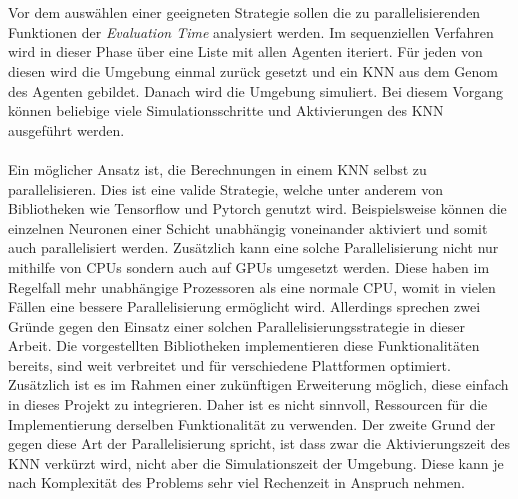 \\\\
Vor dem auswählen einer geeigneten Strategie sollen die zu parallelisierenden Funktionen der \emph{Evaluation Time} analysiert werden. Im sequenziellen Verfahren wird in dieser Phase über eine Liste mit allen Agenten iteriert. Für jeden von diesen wird die Umgebung einmal zurück gesetzt und ein \ac{KNN} aus dem Genom des Agenten gebildet. Danach wird die Umgebung simuliert. Bei diesem Vorgang können beliebige viele Simulationsschritte und Aktivierungen des \ac{KNN} ausgeführt werden. 
\\\\
Ein möglicher Ansatz ist, die Berechnungen in einem \ac{KNN} selbst zu parallelisieren. Dies ist eine valide Strategie, welche unter anderem von Bibliotheken wie Tensorflow und Pytorch genutzt wird. Beispielsweise können die einzelnen Neuronen einer Schicht unabhängig voneinander aktiviert und somit auch parallelisiert werden. Zusätzlich kann eine solche Parallelisierung nicht nur mithilfe von \acp{CPU} sondern auch auf \acp{GPU} umgesetzt werden. Diese haben im Regelfall mehr unabhängige Prozessoren als eine normale \ac{CPU}, womit in vielen Fällen eine bessere Parallelisierung ermöglicht wird. Allerdings sprechen zwei Gründe gegen den Einsatz einer solchen Parallelisierungsstrategie in dieser Arbeit. Die vorgestellten Bibliotheken implementieren diese Funktionalitäten bereits, sind weit verbreitet und für verschiedene Plattformen optimiert. Zusätzlich ist es im Rahmen einer zukünftigen Erweiterung möglich, diese einfach in dieses Projekt zu integrieren. Daher ist es nicht sinnvoll, Ressourcen für die Implementierung derselben Funktionalität zu verwenden. Der zweite Grund der gegen diese Art der Parallelisierung spricht, ist dass zwar die Aktivierungszeit des \ac{KNN} verkürzt wird, nicht aber die Simulationszeit der Umgebung. Diese kann je nach Komplexität des Problems sehr viel Rechenzeit in Anspruch nehmen. 
\\\\
